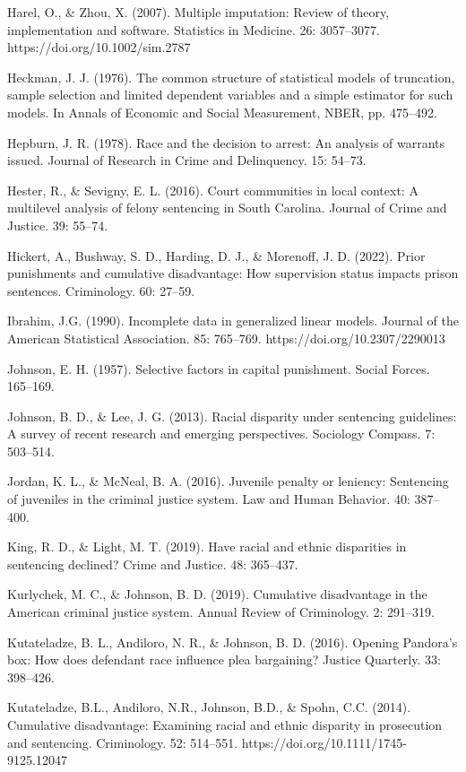 \documentclass[titlepage]{article}
\begin{document}
Harel, O., \& Zhou, X. (2007). Multiple imputation: Review of theory, implementation and software. Statistics in Medicine. 26: 3057--3077. https://doi.org/10.1002/sim.2787

Heckman, J. J. (1976). The common structure of statistical models of truncation, sample selection and limited dependent variables and a simple estimator for such models. In Annals of Economic and Social Measurement, NBER, pp. 475--492.

Hepburn, J. R. (1978). Race and the decision to arrest: An analysis of warrants issued. Journal of Research in Crime and Delinquency. 15: 54--73.

Hester, R., \& Sevigny, E. L. (2016). Court communities in local context: A multilevel analysis of felony sentencing in South Carolina. Journal of Crime and Justice. 39: 55--74.

Hickert, A., Bushway, S. D., Harding, D. J., \& Morenoff, J. D. (2022). Prior punishments and cumulative disadvantage: How supervision status impacts prison sentences. Criminology. 60: 27--59.

Ibrahim, J.G. (1990). Incomplete data in generalized linear models. Journal of the American Statistical Association. 85: 765--769. https://doi.org/10.2307/2290013

Johnson, E. H. (1957). Selective factors in capital punishment. Social Forces. 165--169.

Johnson, B. D., \& Lee, J. G. (2013). Racial disparity under sentencing guidelines: A survey of recent research and emerging perspectives. Sociology Compass. 7: 503--514.

Jordan, K. L., \& McNeal, B. A. (2016). Juvenile penalty or leniency: Sentencing of juveniles in the criminal justice system. Law and Human Behavior. 40: 387--400.

King, R. D., \& Light, M. T. (2019). Have racial and ethnic disparities in sentencing declined? Crime and Justice. 48: 365--437.

Kurlychek, M. C., \& Johnson, B. D. (2019). Cumulative disadvantage in the American criminal justice system. Annual Review of Criminology. 2: 291--319.

Kutateladze, B. L., Andiloro, N. R., \& Johnson, B. D. (2016). Opening Pandora’s box: How does defendant race influence plea bargaining? Justice Quarterly. 33: 398--426.

Kutateladze, B.L., Andiloro, N.R., Johnson, B.D., \& Spohn, C.C. (2014). Cumulative disadvantage: Examining racial and ethnic disparity in prosecution and sentencing. Criminology. 52: 514--551. https://doi.org/10.1111/1745-9125.12047
\end{document}
